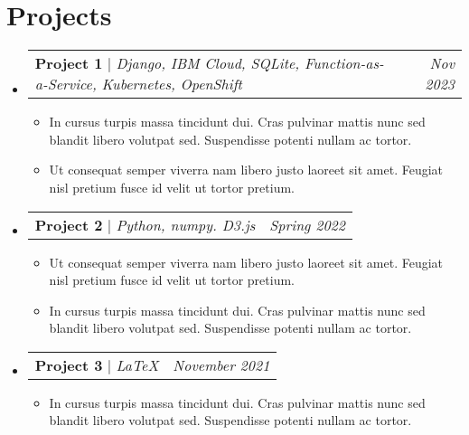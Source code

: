 \documentclass[letterpaper,10pt]{article}
\makeatletter
\newcommand{\subheadingtitlevspace}{\vspace{-3pt}}
\newcommand{\resumeItem}[1]{\item{#1 \vspace{-4pt}}}
\newcommand{\titleItem}[1]{\textbf{#1}}
\newcommand{\resumeProjectHeading}[2]{
    \item
    \begin{tabular*}{0.97\textwidth}{l@{\extracolsep{\fill}}r}
        #1 & \textit{ #2} \\
    \end{tabular*}\vspace{-9pt}
}
\newcommand{\resumeSubHeadingListStart}{\subheadingtitlevspace\begin{itemize}[leftmargin=0.15in, label={}]}
\newcommand{\resumeSubHeadingListEnd}{\end{itemize}}
\newcommand{\resumeItemListStart}{\begin{itemize}}
\newcommand{\resumeItemListEnd}{\end{itemize}\vspace{-8pt}}
\makeatother
\begin{document}
\section{Projects}
  \resumeSubHeadingListStart
    \resumeProjectHeading{\titleItem{Project 1} $|$ \emph{Django, IBM Cloud, SQLite, Function-as-a-Service, Kubernetes, OpenShift}}{Nov 2023}
      \resumeItemListStart
        \resumeItem{In cursus turpis massa tincidunt dui. Cras pulvinar mattis nunc sed blandit libero volutpat sed. Suspendisse potenti nullam ac tortor.}
        \resumeItem{Ut consequat semper viverra nam libero justo laoreet sit amet. Feugiat nisl pretium fusce id velit ut tortor pretium.}
      \resumeItemListEnd
    \resumeProjectHeading{\titleItem{Project 2} $|$ \emph{Python, numpy. D3.js}}{Spring 2022}
      \resumeItemListStart
        \resumeItem{Ut consequat semper viverra nam libero justo laoreet sit amet. Feugiat nisl pretium fusce id velit ut tortor pretium.}
        \resumeItem{In cursus turpis massa tincidunt dui. Cras pulvinar mattis nunc sed blandit libero volutpat sed. Suspendisse potenti nullam ac tortor.}
      \resumeItemListEnd
    \resumeProjectHeading{\titleItem{Project 3} $|$ \emph{\LaTeX}}{November 2021}
      \resumeItemListStart
        \resumeItem{In cursus turpis massa tincidunt dui. Cras pulvinar mattis nunc sed blandit libero volutpat sed. Suspendisse potenti nullam ac tortor.}
      \resumeItemListEnd
  \resumeSubHeadingListEnd
\end{document}
